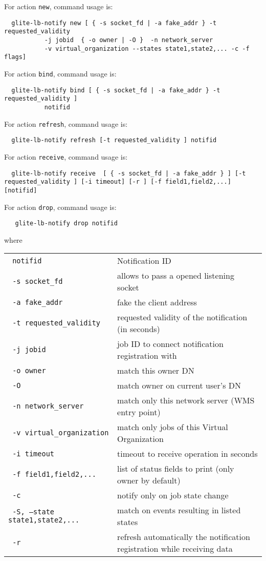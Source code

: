 For action \verb'new', command usage is:

\begin{verbatim}
  glite-lb-notify new [ { -s socket_fd | -a fake_addr } -t requested_validity
           -j jobid  { -o owner | -O }  -n network_server 
           -v virtual_organization --states state1,state2,... -c -f flags]
\end{verbatim}

For action \verb'bind', command usage is:
\begin{verbatim}
  glite-lb-notify bind [ { -s socket_fd | -a fake_addr } -t requested_validity ] 
           notifid
\end{verbatim}

For action \verb'refresh', command usage is:
\begin{verbatim}
  glite-lb-notify refresh [-t requested_validity ] notifid
\end{verbatim}

For action \verb'receive', command usage is:
\begin{verbatim}
  glite-lb-notify receive  [ { -s socket_fd | -a fake_addr } ] [-t requested_validity ] [-i timeout] [-r ] [-f field1,field2,...] [notifid]
\end{verbatim}

For action \verb'drop', command usage is:
\begin{verbatim}
   glite-lb-notify drop notifid
\end{verbatim}

where

\begin{tabularx}{\textwidth}{lX}
\texttt{  notifid} & Notification ID \\
\texttt{  -s socket\_fd} &  allows  to  pass  a opened listening socket  \\
\texttt{  -a fake\_addr} &  fake the client address \\
\texttt{  -t requested\_validity} & requested validity of the notification (in seconds)   \\
\texttt{  -j jobid} & job ID to connect notification registration with   \\
\texttt{  -o owner} & match this owner DN   \\
\texttt{  -O} & match owner on current user's DN \\
\texttt{  -n network\_server} &  match only this network server (WMS entry point)  \\
\texttt{  -v virtual\_organization} & match only jobs of this Virtual Organization  \\
\texttt{  -i timeout} & timeout to receive operation in seconds   \\
\texttt{  -f field1,field2,...} & list of status fields to print (only owner by default)   \\
\texttt{  -c} & notify only on job state change \\
\texttt{  -S, --state state1,state2,...} & match on events resulting in listed states   \\
\texttt{  -r} & refresh automatically the notification registration while receiving data\\
\end{tabularx}

